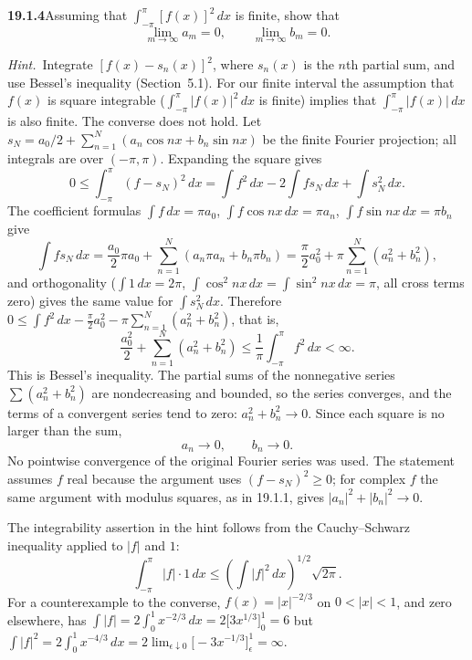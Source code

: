 \par\bigskip
\noindent\textbf{19.1.4}\quad Assuming that 
$\displaystyle\int_{-\pi}^{\pi}[f(x)]^{2}\,dx$ is finite, show that
\[
\lim_{m\to\infty}a_{m}=0,\qquad\lim_{m\to\infty}b_{m}=0.
\]
\par\emph{Hint.}~Integrate $[f(x)-s_{n}(x)]^{2}$, where $s_{n}(x)$
is the $n$th partial sum, and use Bessel's inequality
(Section~5.1). For our finite interval the assumption that $f(x)$
is square integrable
($\displaystyle\int_{-\pi}^{\pi}|f(x)|^{2}\,dx$ is finite) implies
that $\displaystyle\int_{-\pi}^{\pi}|f(x)|\,dx$ is also finite. The
converse does not hold.
\solution
Let $s_N=a_0/2+\sum_{n=1}^N(a_n\cos nx+b_n\sin nx)$ be the finite
Fourier projection; all integrals are over $(-\pi,\pi)$. Expanding the
square gives
\[
0\le\int_{-\pi}^{\pi}(f-s_N)^2\,dx
=\int f^2\,dx-2\int fs_N\,dx+\int s_N^2\,dx.
\]
The coefficient formulas $\int f\,dx=\pi a_0$, $\int f\cos nx\,dx=\pi a_n$,
$\int f\sin nx\,dx=\pi b_n$ give
\[
\int fs_N\,dx=\frac{a_0}2\pi a_0+\sum_{n=1}^N(a_n\pi a_n+b_n\pi b_n)
=\frac\pi2a_0^2+\pi\sum_{n=1}^N(a_n^2+b_n^2),
\]
and orthogonality ($\int1\,dx=2\pi$, $\int\cos^2nx\,dx=\int\sin^2nx\,dx=\pi$,
all cross terms zero) gives the same value for $\int s_N^2\,dx$.
Therefore
$0\le\int f^2\,dx-\frac\pi2a_0^2-\pi\sum_{n=1}^N(a_n^2+b_n^2)$, that is,
\[
\frac{a_0^2}{2}+\sum_{n=1}^N(a_n^2+b_n^2)
\le\frac1\pi\int_{-\pi}^{\pi}f^2\,dx<\infty.
\]
This is Bessel's inequality. The partial sums of the nonnegative series
$\sum(a_n^2+b_n^2)$ are nondecreasing and bounded, so the series
converges, and the terms of a convergent series tend to zero:
$a_n^2+b_n^2\to0$. Since each square is no larger than the sum,
\[
\boxed{a_n\to0,\qquad b_n\to0.}
\]
No pointwise convergence of the original Fourier series was used.
The statement assumes $f$ real because the argument uses
$(f-s_N)^2\ge0$; for complex $f$ the same argument with modulus squares,
as in 19.1.1, gives $|a_n|^2+|b_n|^2\to0$.

The integrability assertion in the hint follows from the
Cauchy--Schwarz inequality applied to $|f|$ and $1$:
\[
\int_{-\pi}^{\pi}|f|\cdot1\,dx
\le\left(\int|f|^2\,dx\right)^{1/2}\sqrt{2\pi}.
\]
For a counterexample to the converse, $f(x)=|x|^{-2/3}$ on $0<|x|<1$,
and zero elsewhere, has
$\int|f|=2\int_0^1x^{-2/3}\,dx=2\bigl[3x^{1/3}\bigr]_0^1=6$ but
$\int|f|^2=2\int_0^1x^{-4/3}\,dx
=2\lim_{\epsilon\downarrow0}\bigl[-3x^{-1/3}\bigr]_\epsilon^1=\infty$.

